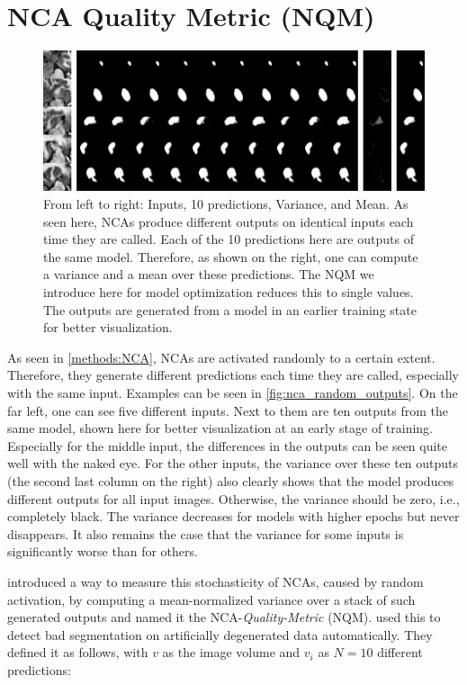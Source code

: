 \section{NCA Quality Metric (NQM)}
\label{methods:NQM}
\begin{figure}
    \centering
    \includegraphics[width=\linewidth]{Graphics/nqm_stack10_epoch_50_var_mu.png}%
    \caption{From left to right: Inputs, 10 predictions, Variance, and Mean. As seen here, NCAs produce different outputs on identical inputs each time they are called. Each of the 10 predictions here are outputs of the same model. Therefore, as shown on the right, one can compute a variance and a mean over these predictions. The NQM we introduce here for model optimization reduces this to single values. The outputs are generated from a model in an earlier training state for better visualization.}
    \label{fig:nca_random_outputs}
\end{figure}

As seen in \autoref{methods:NCA}, NCAs are activated randomly to a certain extent. Therefore, they generate different predictions each time they are called, especially with the same input. Examples can be seen in \autoref{fig:nca_random_outputs}. On the far left, one can see five different inputs. Next to them are ten outputs from the same model, shown here for better visualization at an early stage of training. Especially for the middle input, the differences in the outputs can be seen quite well with the naked eye. For the other inputs, the variance over these ten outputs (the second last column on the right) also clearly shows that the model produces different outputs for all input images. Otherwise, the variance should be zero, i.e., completely black. The variance decreases for models with higher epochs but never disappears. It also remains the case that the variance for some inputs is significantly worse than for others.

\autocite{kalkhof:2023:M3D-NCA} introduced a way to measure this stochasticity of NCAs, caused by random activation, by computing a mean-normalized variance over a stack of such generated outputs and named it the NCA-\textit{Quality-Metric} (NQM). \autocite{kalkhof:2023:M3D-NCA} used this to detect bad segmentation on artificially degenerated data automatically. They defined it as follows, with $v$ as the image volume and $v_i$ as $N=10$ different predictions:

